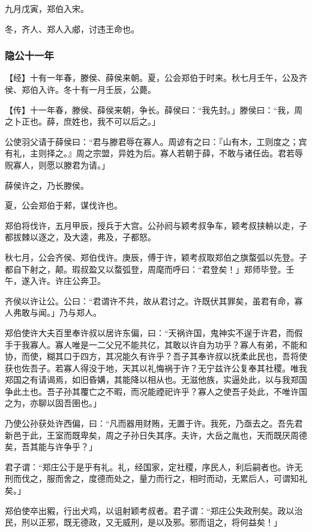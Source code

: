 \documentclass[]{article}
\begin{document}
九月戊寅，郑伯入宋。

冬，齐人、郑人入郕，讨违王命也。

\hypertarget{header-n139}{%
\subsubsection{隐公十一年}\label{header-n139}}

【经】十有一年春，滕侯、薛侯来朝。夏，公会郑伯于时来。秋七月壬午，公及齐侯、郑伯入许。冬十有一月壬辰，公薨。

【传】十一年春，滕侯、薛侯来朝，争长。薛侯曰：``我先封。」滕侯曰：``我，周之卜正也。薛，庶姓也，我不可以后之。」

公使羽父请于薛侯曰：``君与滕君辱在寡人。周谚有之曰：『山有木，工则度之；宾有礼，主则择之。』周之宗盟，异姓为后。寡人若朝于薛，不敢与诸任齿。君若辱贶寡人，则愿以滕君为请。」

薛侯许之，乃长滕侯。

夏，公会郑伯于郲，谋伐许也。

郑伯将伐许，五月甲辰，授兵于大宫。公孙阏与颖考叔争车，颖考叔挟輈以走，子都拔棘以逐之，及大逵，弗及，子都怒。

秋七月，公会齐侯、郑伯伐许。庚辰，傅于许，颖考叔取郑伯之旗蝥弧以先登。子都自下射之，颠。瑕叔盈又以蝥弧登，周麾而呼曰：``君登矣！」郑师毕登。壬午，遂入许。许庄公奔卫。

齐侯以许让公。公曰：``君谓许不共，故从君讨之。许既伏其罪矣，虽君有命，寡人弗敢与闻。」乃与郑人。

郑伯使许大夫百里奉许叔以居许东偏，曰：``天祸许国，鬼神实不逞于许君，而假手于我寡人。寡人唯是一二父兄不能共亿，其敢以许自为功乎？寡人有弟，不能和协，而使，糊其口于四方，其况能久有许乎？吾子其奉许叔以抚柔此民也，吾将使获也佐吾子。若寡人得没于地，天其以礼悔祸于许？无宁兹许公复奉其社稷。唯我郑国之有请谒焉，如旧昏媾，其能降以相从也。无滋他族，实逼处此，以与我郑国争此土也。吾子孙其覆亡之不暇，而况能禋祀许乎？寡人之使吾子处此，不唯许国之为，亦聊以固吾圉也。」

乃使公孙获处许西偏，曰：``凡而器用财贿，无置于许。我死，乃亟去之。吾先君新邑于此，王室而既卑矣，周之子孙日失其序。夫许，大岳之胤也，天而既厌周德矣，吾其能与许争乎？」

君子谓：``郑庄公于是乎有礼。礼，经国家，定社稷，序民人，利后嗣者也。许无刑而伐之，服而舍之，度德而处之，量力而行之，相时而动，无累后人，可谓知礼矣。」

郑伯使卒出豭，行出犬鸡，以诅射颖考叔者。君子谓：``郑庄公失政刑矣。政以治民，刑以正邪，既无德政，又无威刑，是以及邪。邪而诅之，将何益矣！」
\end{document}
